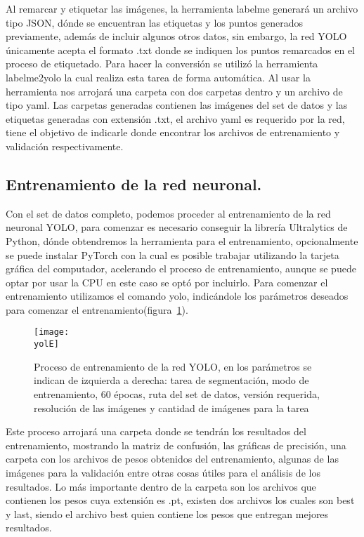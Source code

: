 \documentclass[a4paper, 12pt]{article}
\newcommand{\yolE}{img/yolo_comand.png}
\begin{document}
    Al remarcar y etiquetar las imágenes, la herramienta labelme generará un archivo tipo JSON, dónde se encuentran las etiquetas y los puntos generados previamente, además de incluir algunos otros datos, sin embargo, la red YOLO únicamente acepta el formato .txt donde se indiquen los puntos remarcados en el proceso de etiquetado. Para hacer la conversión se utilizó la herramienta labelme2yolo la cual realiza esta tarea de forma automática. Al usar la herramienta nos arrojará una carpeta con dos carpetas dentro y un archivo de tipo yaml. Las carpetas generadas contienen las imágenes del set de datos y las etiquetas generadas con extensión .txt, el archivo yaml es requerido por la red, tiene el objetivo de indicarle donde encontrar los archivos de entrenamiento y validación respectivamente. 

    \subsection{Entrenamiento de la red neuronal.} 
    Con el set de datos completo, podemos proceder al entrenamiento de la red neuronal YOLO, para comenzar es necesario conseguir la librería Ultralytics de Python, dónde obtendremos la herramienta para el entrenamiento, opcionalmente se puede instalar PyTorch con la cual es posible trabajar utilizando la tarjeta gráfica del computador, acelerando el proceso de entrenamiento, aunque se puede optar por usar la CPU en este caso se optó por incluirlo. Para comenzar el entrenamiento utilizamos el comando yolo, indicándole los parámetros deseados para comenzar el entrenamiento(figura~\ref{fig:yolo_train}). 

    \begin{figure}[H] 
        \centering 
        \texttt{[image: \\yolE]} 
        \caption{Proceso de entrenamiento de la red YOLO, en los parámetros se indican de izquierda a derecha: tarea de segmentación, modo de entrenamiento, 60 épocas, ruta del set de datos, versión requerida, resolución de las imágenes y cantidad de imágenes para la tarea} 
        \label{fig:yolo_train} 
    \end{figure} 

    Este proceso arrojará una carpeta donde se tendrán los resultados del entrenamiento, mostrando la matriz de confusión, las gráficas de precisión, una carpeta con los archivos de pesos obtenidos del entrenamiento, algunas de las imágenes para la validación entre otras cosas útiles para el análisis de los resultados. Lo más importante dentro de la carpeta son los archivos que contienen los pesos cuya extensión es .pt, existen dos archivos los cuales son best y last, siendo el archivo best quien contiene los pesos que entregan mejores resultados.  
\end{document}
